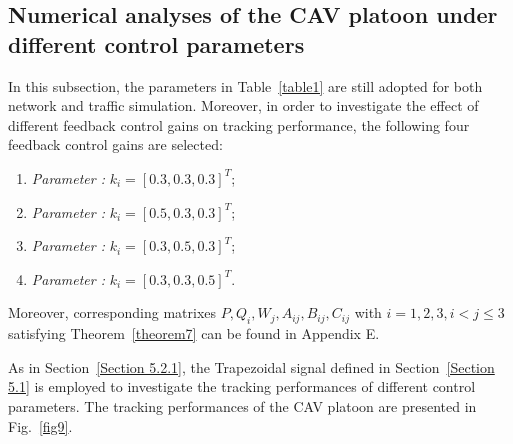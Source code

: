 \documentclass[a4paper]{cas-sc}
\begin{document}
\subsection{Numerical analyses of the CAV platoon under different control parameters}
\label{Section 5.3}

In this subsection, the parameters in Table~\ref{table1} are still adopted for both network and traffic simulation. Moreover, in order to investigate the effect of different feedback control gains on tracking performance, the following four feedback control gains are selected:
\begin{enumerate}
  \item \textit{Parameter \uppercase\expandafter{}:} $ {k_i} = {[0.3,0.3,0.3]^T} $;
  \item \textit{Parameter \uppercase\expandafter{}:} $ {k_i} = {[0.5,0.3,0.3]^T} $;
  \item \textit{Parameter \uppercase\expandafter{}:} $ {k_i} = {[0.3,0.5,0.3]^T} $;
  \item \textit{Parameter \uppercase\expandafter{}:} $ {k_i} = {[0.3,0.3,0.5]^T} $.
\end{enumerate}
Moreover, corresponding matrixes $P,Q_i,W_j,A_{ij},B_{ij},C_{ij}$ with $i=1,2,3,i<j\le3 $satisfying Theorem~\ref{theorem7} can be found in Appendix E.

As in Section~\ref{Section 5.2.1}, the Trapezoidal signal defined in Section~\ref{Section 5.1} is employed to investigate the tracking performances of different control parameters. The tracking performances of the CAV platoon are presented in Fig.~\ref{fig9}.
\end{document}
